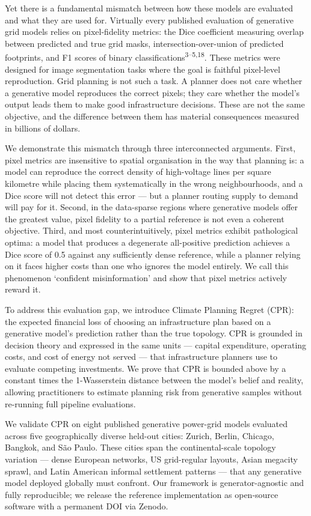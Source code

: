 \documentclass[10pt,a4paper]{article}
\begin{document}
Yet there is a fundamental mismatch between how these models are
evaluated and what they are used for. Virtually every published
evaluation of generative grid models relies on pixel-fidelity
metrics: the Dice coefficient measuring overlap between predicted
and true grid masks, intersection-over-union of predicted
footprints, and F1 scores of binary classifications\textsuperscript{3--5,18}.
These metrics were designed for image segmentation tasks where the
goal is faithful pixel-level reproduction. Grid planning is not
such a task. A planner does not care whether a generative model
reproduces the correct pixels; they care whether the model's
output leads them to make good infrastructure decisions. These
are not the same objective, and the difference between them has
material consequences measured in billions of dollars.

We demonstrate this mismatch through three interconnected
arguments. First, pixel metrics are insensitive to spatial
organisation in the way that planning is: a model can reproduce
the correct density of high-voltage lines per square kilometre
while placing them systematically in the wrong neighbourhoods, and
a Dice score will not detect this error --- but a planner routing
supply to demand will pay for it. Second, in the data-sparse
regions where generative models offer the greatest value, pixel
fidelity to a partial reference is not even a coherent objective.
Third, and most counterintuitively, pixel metrics exhibit
pathological optima: a model that produces a degenerate
all-positive prediction achieves a Dice score of 0.5 against any
sufficiently dense reference, while a planner relying on it faces
higher costs than one who ignores the model entirely. We call this
phenomenon `confident misinformation' and show that pixel metrics
actively reward it.

To address this evaluation gap, we introduce Climate Planning
Regret (CPR): the expected financial loss of choosing an
infrastructure plan based on a generative model's prediction
rather than the true topology. CPR is grounded in decision theory
and expressed in the same units --- capital expenditure, operating
costs, and cost of energy not served --- that infrastructure
planners use to evaluate competing investments. We prove that CPR
is bounded above by a constant times the 1-Wasserstein distance
between the model's belief and reality, allowing practitioners to
estimate planning risk from generative samples without re-running
full pipeline evaluations.

We validate CPR on eight published generative power-grid models
evaluated across five geographically diverse held-out cities:
Zurich, Berlin, Chicago, Bangkok, and S\~ao Paulo. These cities
span the continental-scale topology variation --- dense European
networks, US grid-regular layouts, Asian megacity sprawl, and
Latin American informal settlement patterns --- that any
generative model deployed globally must confront. Our framework is
generator-agnostic and fully reproducible; we release the
reference implementation as open-source software with a permanent
DOI via Zenodo.
\end{document}
